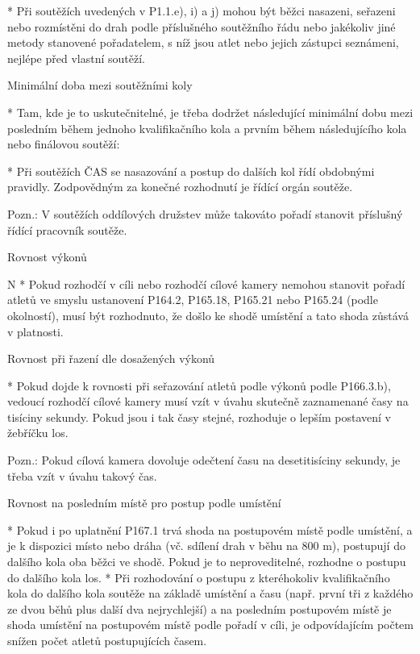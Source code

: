 * Při soutěžích uvedených v P1.1.e), i) a j) mohou být běžci nasazeni, seřazeni nebo rozmístěni do drah podle příslušného soutěžního řádu nebo jakékoliv jiné metody stanovené pořadatelem, s níž jsou atlet nebo jejich zástupci seznámeni, nejlépe před vlastní soutěží.

Minimální doba mezi soutěžními koly

* Tam, kde je to uskutečnitelné, je třeba dodržet následující minimální dobu mezi posledním během jednoho kvalifikačního kola a prvním během následujícího kola nebo finálovou soutěží:


* Při soutěžích ČAS se nasazování a postup do dalších kol řídí obdobnými pravidly. Zodpovědným za konečné rozhodnutí je řídící orgán soutěže.

Pozn.: V soutěžích oddílových družstev může takováto pořadí stanovit příslušný řídící pracovník soutěže.
\enditems

\secc Rovnost výkonů

\begitems \style N
* Pokud rozhodčí v cíli nebo rozhodčí cílové kamery nemohou stanovit pořadí atletů ve smyslu ustanovení P164.2, P165.18, P165.21 nebo P165.24 (podle okolností), musí být rozhodnuto, že došlo ke shodě umístění a tato shoda zůstává v platnosti.

Rovnost při řazení dle dosažených výkonů

* Pokud dojde k rovnosti při seřazování atletů podle výkonů podle P166.3.b), vedoucí rozhodčí cílové kamery musí vzít v úvahu skutečně zaznamenané časy na tisíciny sekundy. Pokud jsou i tak časy stejné, rozhoduje o lepším postavení v žebříčku los.

Pozn.: Pokud cílová kamera dovoluje odečtení času na desetitisíciny sekundy, je třeba vzít v úvahu takový čas.

Rovnost na posledním místě pro postup podle umístění

* Pokud i po uplatnění P167.1 trvá shoda na postupovém místě podle umístění, a je k dispozici místo nebo dráha (vč. sdílení drah v běhu na 800 m), postupují do dalšího kola oba běžci ve shodě. Pokud je to neproveditelné, rozhodne o postupu do dalšího kola los.
* Při rozhodování o postupu z kteréhokoliv kvalifikačního kola do dalšího kola soutěže na základě umístění a času (např. první tři z každého ze dvou běhů plus další dva nejrychlejší) a na posledním postupovém místě je shoda umístění na postupovém místě podle pořadí v cíli, je odpovídajícím počtem snížen počet atletů postupujících časem.

